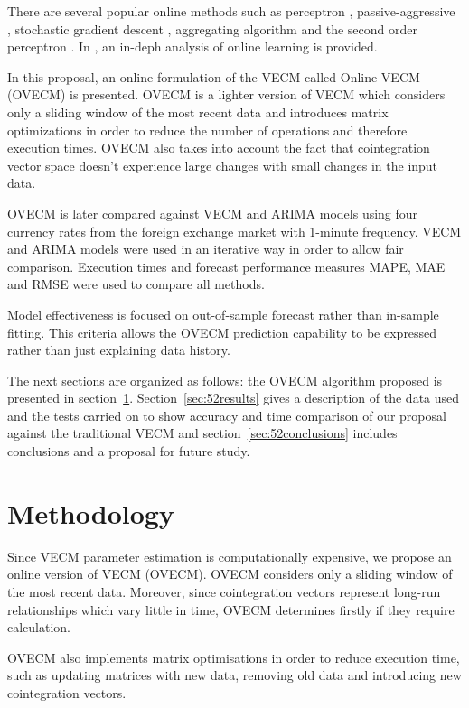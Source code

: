 There are several popular online methods such as perceptron \cite{rosenblatt58},
passive-aggressive \cite{crammerETall2006}, stochastic gradient
descent \cite{zhang2004}, aggregating algorithm \cite{vovk2001} and the second
order perceptron \cite{cesa-bianchi2005}.  In \cite{cesa-bianchi2006}, an
in-deph analysis of online learning is provided. 

In this proposal, an online formulation of the VECM called Online VECM (OVECM)
is presented. OVECM is a lighter version of VECM which considers only a sliding
window of the most recent data and introduces matrix optimizations in order to
reduce the number of operations and therefore execution times. OVECM also takes
into account the fact that cointegration vector space doesn't experience large
changes with small changes in the input data. 

OVECM is later compared against VECM and ARIMA models using four currency rates
from the foreign exchange market with 1-minute frequency. VECM and ARIMA models
were used in an iterative way in order to allow fair comparison. Execution times
and forecast performance measures MAPE, MAE and RMSE were used to compare all
methods. 

Model effectiveness is focused on out-of-sample forecast rather than in-sample
fitting. This criteria allows the OVECM prediction capability to be expressed
rather than just explaining data history.

The next sections are organized as follows: the OVECM algorithm proposed is
presented in section~\ref{sec:52methodology}. Section~\ref{sec:52results} gives a
description of the data used and the tests carried on to show accuracy and time
comparison of our proposal against the traditional VECM and
section~\ref{sec:52conclusions} includes conclusions and a proposal for future
study.


\section{Methodology} \label{sec:52methodology}

Since VECM parameter estimation is computationally expensive, we propose an
online version of VECM (OVECM).  OVECM considers only a sliding window of the
most recent data. Moreover, since cointegration vectors represent long-run
relationships which vary little in time, OVECM determines firstly if they
require calculation. 

OVECM also implements matrix optimisations in order to reduce execution time,
such as updating matrices with new data, removing old data and introducing new
cointegration vectors.

